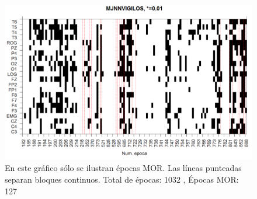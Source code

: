 \begin{figure}
\includegraphics[width=\textwidth]{est02.png} 
\caption{En este gráfico sólo se ilustran épocas MOR. Las líneas punteadas separan bloques continuos.
Total de épocas: 1032 , Épocas MOR: 127}
\end{figure}

